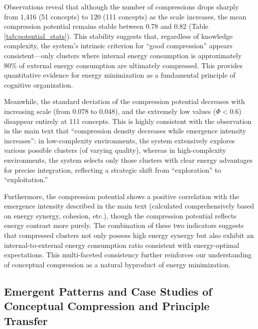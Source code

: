 \documentclass[10pt,onecolumn]{article}
\begin{document}
Observations reveal that although the number of compressions drops sharply from 1,416 (51 concepts) to 120 (111 concepts) as the scale increases, the mean compression potential remains stable between 0.78 and 0.82 (Table \ref{tab:potential_stats}). This stability suggests that, regardless of knowledge complexity, the system’s intrinsic criterion for “good compression” appears consistent—only clusters where internal energy consumption is approximately 80\% of external energy consumption are ultimately compressed. This provides quantitative evidence for energy minimization as a fundamental principle of cognitive organization.

Meanwhile, the standard deviation of the compression potential decreases with increasing scale (from 0.078 to 0.048), and the extremely low values ($\Phi < 0.6$) disappear entirely at 111 concepts. This is highly consistent with the observation in the main text that “compression density decreases while emergence intensity increases”: in low-complexity environments, the system extensively explores various possible clusters (of varying quality), whereas in high-complexity environments, the system selects only those clusters with clear energy advantages for precise integration, reflecting a strategic shift from “exploration” to “exploitation.”

Furthermore, the compression potential shows a positive correlation with the emergence intensity described in the main text (calculated comprehensively based on energy synergy, cohesion, etc.), though the compression potential reflects energy contrast more purely. The combination of these two indicators suggests that compressed clusters not only possess high energy synergy but also exhibit an internal-to-external energy consumption ratio consistent with energy-optimal expectations. This multi-faceted consistency further reinforces our understanding of conceptual compression as a natural byproduct of energy minimization.

\subsection{Emergent Patterns and Case Studies of Conceptual Compression and Principle Transfer}
\end{document}
